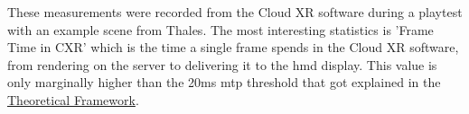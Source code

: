 These measurements were recorded from the Cloud XR software during a playtest with an example scene from Thales. The most interesting statistics is 'Frame Time in CXR' which is the time a single frame spends in the Cloud XR software, from rendering on the server to delivering it to the \acrshort{hmd} display. This value is only marginally higher than the 20\acrshort{ms} \acrshort{mtp} threshold that got explained in the \hyperref[sec:theo]{Theoretical Framework}. 